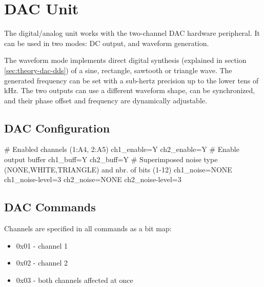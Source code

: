 \section{DAC Unit}

The digital/analog unit works with the two-channel \gls{DAC} hardware peripheral. It can be used in two modes: \gls{DC} output, and waveform generation.

The waveform mode implements direct digital synthesis (explained in section \ref{sec:theory-dac-dds}) of a sine, rectangle, sawtooth or triangle wave. The generated frequency can be set with a sub-hertz precision up to the lower tens of kHz. The two outputs can use a different waveform shape, can be synchronized, and their phase offset and frequency are dynamically adjustable.

\subsection{DAC Configuration}

\begin{inicode}
# Enabled channels (1:A4, 2:A5)
ch1_enable=Y
ch2_enable=Y
# Enable output buffer
ch1_buff=Y
ch2_buff=Y
# Superimposed noise type (NONE,WHITE,TRIANGLE) and nbr. of bits (1-12)
ch1_noise=NONE
ch1_noise-level=3
ch2_noise=NONE
ch2_noise-level=3
\end{inicode}

\subsection{DAC Commands}

Channels are specified in all commands as a bit map:

\begin{itemize}[nosep]
	\item 0x01 - channel 1
	\item 0x02 - channel 2
	\item 0x03 - both channels affected at once
\end{itemize}


